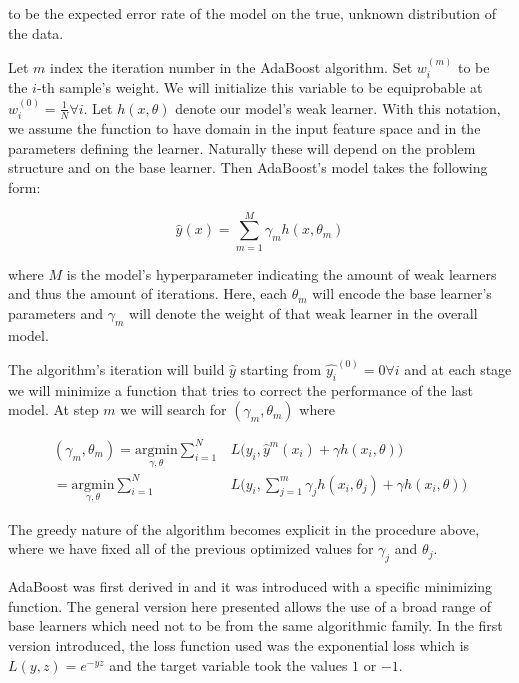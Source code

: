 \documentclass{article}%
\theoremstyle{definition}
\begin{document}
to be the expected error rate of the model on the true,  unknown distribution of the data.

Let $m$ index the iteration number in the AdaBoost algorithm. Set $w^{(m)}_i$ to be the $i$-th sample's weight. We will initialize this variable to be equiprobable at $w^{(0)}_i = \frac{1}{N} \forall i$. Let $h(x,\theta)$  denote our model's weak learner. With this notation, we assume the function to have domain in the input feature space and in the parameters defining the learner. Naturally these will depend on the problem structure and on the base learner. Then AdaBoost's model takes the following form:

\begin{equation} \label{equation-adaBoostModel}
\hat{y}(x) = \sum_{m=1}^{M} \gamma_m h(x,\theta_m)
\end{equation}

where $M$ is the model's hyperparameter indicating the amount of weak learners and thus the amount of iterations. Here, each $\theta_m$ will encode the base learner's parameters and $\gamma_m$ will denote the weight of that weak learner in the overall model.

The algorithm's iteration will build $\hat{y}$ starting from $\hat{y_i}^{(0)}= 0 \forall i$ and at each stage we will minimize a function that tries to correct the performance of the last model. At step $m$ we will search for $(\gamma_{m}, \theta_{m})$ where

\begin{equation} \label{equation-adaBoostIteration}
\begin{split}
(\gamma_{m}, \theta_{m}) = \underset{\gamma, \theta}{\mathrm{argmin}}  \sum_{i=1}^{N} & L\big( y_i,   \hat{y}^{m}(x_i) + \gamma h(x_i,\theta) \big) \\
= \underset{\gamma, \theta}{\mathrm{argmin}} \sum_{i=1}^{N}  & L\big( y_i,    \sum_{j=1}^{m} \gamma_j h(x_i,\theta_j) + \gamma h(x_i,\theta) \big) 
\end{split}
\end{equation}

The greedy nature of the algorithm becomes explicit in the procedure above, where we have fixed all of the previous optimized values for $\gamma_j$ and $\theta_j$. 

AdaBoost was first derived in \cite{schapire-adaBoost} and it was introduced with a specific  minimizing function. The general version here presented allows the use of a broad range of base learners which need not to be from the same algorithmic family. In the first version introduced, the loss function used was the exponential loss which is $L(y,z) = e^{-yz}$ and the target variable took the values $1$ or $-1$.
\end{document}
